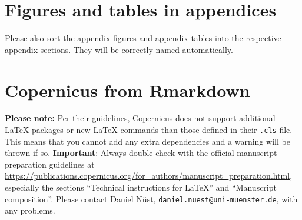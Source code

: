 \documentclass[soil, manuscript]{copernicus}
\begin{document}
\section{Figures and tables in appendices}

Please also sort the appendix figures and appendix tables into the respective appendix sections.
They will be correctly named automatically.

\section{Copernicus from Rmarkdown}

\textbf{Please note:} Per \href{https://publications.copernicus.org/for_authors/manuscript_preparation.html}{their guidelines},
Copernicus does not support additional \LaTeX{} packages
or new \LaTeX{} commands than those defined in their \texttt{.cls} file.
This means that you cannot add any extra dependencies
and a warning will be thrown if so.
\textbf{Important}: Always double-check with the official manuscript preparation guidelines
at \url{https://publications.copernicus.org/for_authors/manuscript_preparation.html},
especially the sections ``Technical instructions for LaTeX'' and ``Manuscript composition''.
Please contact Daniel Nüst, \texttt{daniel.nuest@uni-muenster.de}, with any problems.
\noappendix



\end{document}
